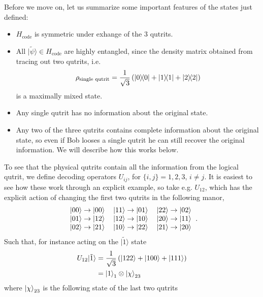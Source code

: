 \documentclass[letter,12pt]{article}
\begin{document}
Before we move on, let us summarize some important features of the states just defined:
\begin{itemize}
	\item $H_{\text{code}}$ is symmetric under exhange of the 3 qutrits.
	\item All $| \tilde \psi \rangle\in H_{\text{code}}$ are highly entangled, since the density matrix obtained from tracing out two qutrits, i.e.
	\begin{equation}
		\begin{aligned}
			\rho_{\text{single qutrit}}=\frac{1}{\sqrt{3}}
			\left(\dyad{0}{0}+\dyad{1}{1}+\dyad{2}{2}\right)	\end{aligned}
	\end{equation}
is a maximally mixed state. 
\item Any single qutrit has no information about the original state.
\item Any two of the three qutrits contains complete information about the original state, so even if Bob looses a single qutrit he can still recover the original information. We will describe how this works below.
\end{itemize}
To see that the physical qutrits contain all the information from the logical qutrit, we define decoding operators $U_{ij}$, for $\{i,j\}=1,2,3$, $i\neq j$. It is easiest to see how these work through an explicit example, so take e.g. $U_{12}$, which has the explicit action of changing the first two qutrits in the following manor,
\begin{align}
	\begin{tabular}{ l c r }
		$|00\rangle\to|00\rangle$ & $|11\rangle \to |01\rangle$ & $|22\rangle\to |02\rangle$ \\ 
		$|01\rangle \to |12\rangle$ & $|12\rangle \to |10\rangle$ & $|20\rangle \to |11\rangle$ \\
		$|02\rangle\to |21\rangle$ & $|10\rangle\to|22\rangle$ & $|21\rangle \to |20\rangle$ 
	\end{tabular}.
\end{align}
Such that, for instance acting on the $|\tilde 1\rangle$ state
\begin{equation}
	\begin{aligned}
		U_{12}|\tilde 1\rangle&=\frac{1}{\sqrt{3}}\left(\ket{122}+\ket{100}+\ket{111}\right)
		\\
		&=\ket{1}_1\otimes \ket{\chi}_{23}
	\end{aligned}
\end{equation}
where $\ket{\chi}_{23}$ is the following state of the last two qutrits
\end{document}
